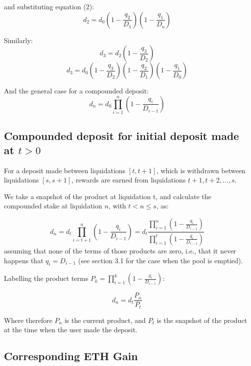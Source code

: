 \documentclass[reqno]{article}
\begin{document}
\bigskip
and substituting equation (2):
\begin{equation} 
    d_2=d_0 \left(1-\frac{q_2}{D_1}\right) \left(1-\frac{q_1}{D_o} \right)
\end{equation}

\bigskip
Similarly:
\begin{equation} 
    d_3=d_2\left(1-\frac{q_3}{D_2}\right)
\end{equation}
\begin{equation} 
    d_3=d_0\left(1-\frac{q_3}{D_2}\right)\left(1-\frac{q_2}{D_1}\right)\left(1-\frac{q_1}{D_0}\right)
\end{equation}

\bigskip
And the general case for a compounded deposit:
\begin{equation} 
    d_n=d_0\prod^n_{i=1}{\left(1-\frac{q_i}{D_{i-1}}\right)}
\end{equation}
\subsection{Compounded deposit for initial deposit made at $t>0$}
For a deposit made between liquidations $[t, t+1]$, which is withdrawn between liquidations $[s, s+1]$, rewards are earned from liquidations $t+1, t+2, \ldots, s$.

We take a snapshot of the product at liquidation t, and calculate the compounded stake at liquidation $n$, with $t < n \leq s$, as:

\begin{equation} 
    d_n=d_t\prod^n_{i=t+1}{\left(1-\frac{q_i}{D_{i-1}}\right)}=d_t\frac{\displaystyle\prod^n_{i=1}{\left(1-\frac{q_i}{D_{i-1}}\right)}}{\displaystyle\prod^t_{i=1}\left(1-\frac{q_i}{D_{i-1}}\right)}
\end{equation}
assuming that none of the terms of those products are zero, i.e., that it never
happens that $q_i = D_{i-1}$ (see section 3.1 for the case when the pool is emptied).

\bigskip
Labelling the product terms $P_k = \displaystyle\prod^k_{i=1}{\left(1-\frac{q_i}{D_{i-1}}\right)}$:

\begin{equation} 
d_n=d_t\frac{P_n}{P_t}
\end{equation}

\bigskip
Where therefore $P_n$ is the current product, and {$P_t$} is the snapshot of the product at the time when the user made the deposit.

\bigskip
\subsection{Corresponding ETH Gain}
\end{document}
